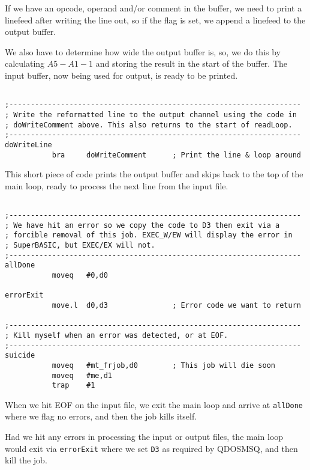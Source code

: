 If we have an opcode, operand and/or comment in the buffer, we need to print a linefeed after writing the line out, so if the flag is set, we append a linefeed to the output buffer.

We also have to determine how wide the output buffer is, so, we do this by calculating $ A5 - A1 - 1 $ and storing the result in the start of the buffer. The input buffer, now being used for output, is ready to be printed.

\begin{lstlisting}[firstnumber=last,caption={ASMReformat Source - End of Main Loop}]

;--------------------------------------------------------------------
; Write the reformatted line to the output channel using the code in
; doWriteComment above. This also returns to the start of readLoop.
;--------------------------------------------------------------------
doWriteLine
           bra     doWriteComment      ; Print the line & loop around
\end{lstlisting}

This short piece of code prints the output buffer and skips back to the top of the main loop, ready to process the next line from the input file.

\begin{lstlisting}[firstnumber=last,caption={ASMReformat Source - End of Job Code}]

;--------------------------------------------------------------------
; We have hit an error so we copy the code to D3 then exit via a
; forcible removal of this job. EXEC_W/EW will display the error in
; SuperBASIC, but EXEC/EX will not.
;--------------------------------------------------------------------
allDone
           moveq   #0,d0

errorExit
           move.l  d0,d3               ; Error code we want to return

;--------------------------------------------------------------------
; Kill myself when an error was detected, or at EOF.
;--------------------------------------------------------------------
suicide
           moveq   #mt_frjob,d0        ; This job will die soon
           moveq   #me,d1
           trap    #1
\end{lstlisting}

When we hit EOF on the input file, we exit the main loop and arrive at \texttt{allDone} where we flag no errors, and then the job kills itself.

Had we hit any errors in processing the input or output files, the main loop would exit via \texttt{errorExit} where we set \texttt{D3} as required by QDOSMSQ, and then kill the job.

